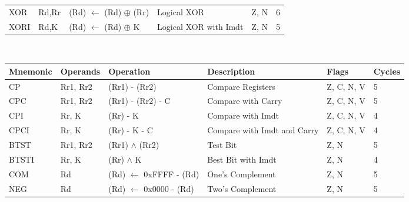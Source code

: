 \begin{footnotesize}
\begin{tabular}{|p{14.5mm}|p{14mm}|p{47mm}|p{46.5mm}|p{14mm}|p{10mm}|}
    XOR      & Rd,Rr     & (Rd) $\leftarrow$ (Rd) $\oplus$ (Rr)                                                    & Logical XOR                               & Z, N           & 6      \\
    XORI     & Rd,K      & (Rd) $\leftarrow$ (Rd) $\oplus$ K                                                       & Logical XOR with Imdt                     & Z, N           & 5      \\
    \hline
\end{tabular}    
\newline \\
\begin{tabular}{|p{14.5mm}|p{14mm}|p{47mm}|p{46.5mm}|p{14mm}|p{10mm}|}
    \rowcolor{gray!50}
    \hline
    Mnemonic & Operands  & Operation                                                              & Description & Flags & Cycles \\ \hline
    CP       & Rr1, Rr2  & (Rr1) - (Rr2)                                                          & Compare Registers                         & Z, C, N, V     & 5      \\
    CPC      & Rr1, Rr2  & (Rr1) - (Rr2) - C                                                      & Compare with Carry                        & Z, C, N, V     & 5      \\
    CPI      & Rr, K     & (Rr) - K                                                               & Compare with Imdt                         & Z, C, N, V     & 4      \\
    CPCI     & Rr, K     & (Rr) - K - C                                                           & Compare with Imdt and Carry               & Z, C, N, V     & 4      \\
    BTST     & Rr1, Rr2  & (Rr1) $\land$ (Rr2)                                                          & Test Bit                                  & Z, N           & 5      \\
    BTSTI    & Rr, K     & (Rr) $\land$  K                                                              & Best Bit with Imdt                        & Z, N           & 4      \\
    COM      & Rd        & (Rd) $\leftarrow$ 0xFFFF - (Rd)                                                   & One's Complement                          & Z, N           & 5      \\
    NEG      & Rd        & (Rd) $\leftarrow$ 0x0000 - (Rd)                                                   & Two's Complement                          & Z, N           & 5      \\

\end{tabular}
\end{footnotesize}
